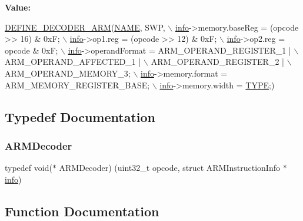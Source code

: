 {\bfseries Value\+:}
\begin{DoxyCode}
\mbox{\hyperlink{decoder-arm_8c_a4fe6e4683fda92c7774b0678f5ab95cc}{DEFINE\_DECODER\_ARM}}(\mbox{\hyperlink{inflate_8h_a164ea0159d5f0b5f12a646f25f99eceaa67bc2ced260a8e43805d2480a785d312}{NAME}}, SWP, \(\backslash\)
        \mbox{\hyperlink{libretro_8h_structretro__game__info}{info}}->memory.baseReg = (opcode >> 16) & 0xF; \(\backslash\)
        \mbox{\hyperlink{libretro_8h_structretro__game__info}{info}}->op1.reg = (opcode >> 12) & 0xF; \(\backslash\)
        \mbox{\hyperlink{libretro_8h_structretro__game__info}{info}}->op2.reg = opcode & 0xF; \(\backslash\)
        \mbox{\hyperlink{libretro_8h_structretro__game__info}{info}}->operandFormat = ARM\_OPERAND\_REGISTER\_1 | \(\backslash\)
            ARM\_OPERAND\_AFFECTED\_1 | \(\backslash\)
            ARM\_OPERAND\_REGISTER\_2 | \(\backslash\)
            ARM\_OPERAND\_MEMORY\_3; \(\backslash\)
        \mbox{\hyperlink{libretro_8h_structretro__game__info}{info}}->memory.format = ARM\_MEMORY\_REGISTER\_BASE; \(\backslash\)
        \mbox{\hyperlink{libretro_8h_structretro__game__info}{info}}->memory.width = \mbox{\hyperlink{inflate9_8h_a164ea0159d5f0b5f12a646f25f99eceaab47ea8bb955afd0adc0ef98517dd6084}{TYPE}};)
\end{DoxyCode}


\subsection{Typedef Documentation}
\mbox{\label{decoder-arm_8c_ae607effbe3bf4de4aa7445cfb2ba2f67}} 
\subsubsection{\texorpdfstring{A\+R\+M\+Decoder}{ARMDecoder}}
{\footnotesize\ttfamily typedef void($\ast$ A\+R\+M\+Decoder) (uint32\+\_\+t opcode, struct A\+R\+M\+Instruction\+Info $\ast$\mbox{\hyperlink{libretro_8h_a283ad41e4809f9c0ebe736a9861d8a91}{info}})}



\subsection{Function Documentation}
\mbox{\label{decoder-arm_8c_ae0a328e9d3c32fcaa891021b7e6aee89}} 
